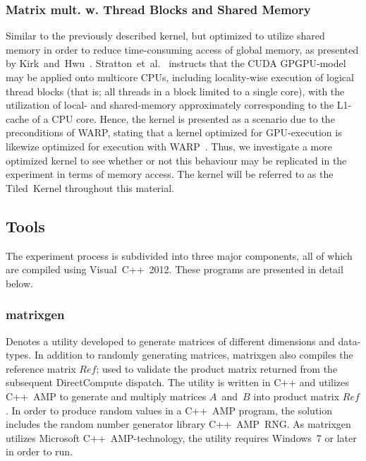 \subsubsection{Matrix mult. w. Thread Blocks and Shared Memory}
Similar to the previously described kernel, but optimized to utilize shared memory in order to reduce time-consuming access of global memory, as presented by Kirk~and~Hwu~\cite[p.~77-93]{Kirk:2010:PMP:1841511}.
Stratton~et~al.~\cite[p.~1-3]{Stratton:2008:MEI:1485701.1485703} instructs that the CUDA GPGPU-model may be applied onto multicore CPUs, including locality-wise execution of logical thread blocks (that is; all threads in a block limited to a single core), with the utilization of local- and shared-memory approximately corresponding to the L1-cache of a CPU core.
Hence, the kernel is presented as a scenario due to the preconditions of WARP, stating that a kernel optimized for GPU-execution is likewize optimized for execution with WARP~.
Thus, we investigate a more optimized kernel to see whether or not this behaviour may be replicated in the experiment in terms of memory access.
The kernel will be referred to as the Tiled~Kernel throughout this material.

\subsection{Tools}
\label{sec:contribution:tools}
The experiment process is subdivided into three major components, all of which are compiled using Visual~C++~2012.
These programs are presented in detail below.

\subsubsection{matrixgen}
Denotes a utility developed to generate matrices of different dimensions and data-types.
In addition to randomly generating matrices, matrixgen also compiles the reference matrix $Ref$; used to validate the product matrix returned from the subsequent DirectCompute dispatch.
The utility is written in C++ and utilizes C++~AMP to generate and multiply matrices $A$~and~$B$ into product matrix $Ref$.
In order to produce random values in a C++~AMP program, the solution includes the random number generator library C++~AMP~RNG.
As matrixgen utilizes Microsoft C++~AMP-technology, the utility requires Windows~7 or later in order to run.

